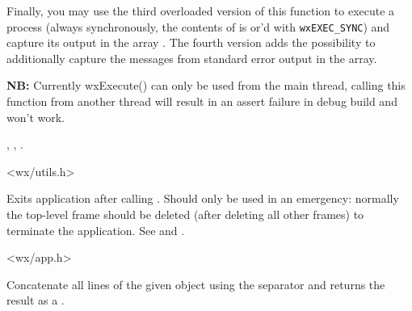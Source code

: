 Finally, you may use the third overloaded version of this function to execute
a process (always synchronously, the contents of  is or'd with
\texttt{wxEXEC\_SYNC}) and capture its output in the array . The
fourth version adds the possibility to additionally capture the messages from
standard error output in the  array.

{\bf NB:} Currently wxExecute() can only be used from the main thread, calling
this function from another thread will result in an assert failure in debug
build and won't work.


, , .







<wx/utils.h>


\label{wxexit}


Exits application after calling .
Should only be used in an emergency: normally the top-level frame
should be deleted (after deleting all other frames) to terminate the
application. See  and .


<wx/app.h>


\label{wxjoin}


Concatenate all lines of the given  object using the separator  and returns
the result as a .

